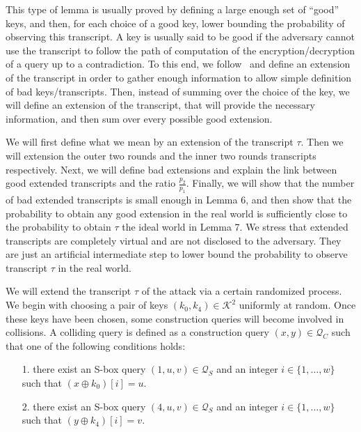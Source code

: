 This type of lemma is usually proved by defining a large enough set of ``good'' keys, and then, for each choice of a good key, lower bounding the probability of observing this transcript. A key is usually said to be good if the adversary cannot use the transcript to follow the path of computation of the encryption/decryption of a query up to a contradiction. To this end, we follow~\cite[Sect. 4.2]{C:CDKLST18} and define an extension of the transcript in order to gather enough information to allow simple definition of bad keys/transcripts. Then, instead of summing over the choice of the key, we will define an extension of the transcript, that will provide the necessary information, and then sum over every possible good extension.


We will first define what we mean by an extension of the transcript $\tau$. Then we will extension the outer two rounds and the inner two rounds transcripts respectively. Next, we will define bad extensions and explain the link between good extended transcripts and the ratio $\frac{p_2}{p_1}$. Finally, we will show that the number of bad extended transcripts is small enough in Lemma 6, and then show that the probability to obtain any good extension in the real world is sufficiently close to the probability to obtain $\tau$ the ideal world in Lemma 7. We stress that extended transcripts are completely virtual and are not disclosed to the adversary. They are just an artificial intermediate step to lower bound the probability to observe transcript $\tau$ in the real world.


We will extend the transcript $\tau$ of the attack via a certain randomized process. We begin with choosing a pair of keys $\left(k_{0}, k_{4}\right) \in \mathcal{K}^{2}$ uniformly at random. Once these keys have been chosen, some construction queries will become involved in collisions. A colliding query is defined as a construction query $(x, y) \in \mathcal{Q}_{C}$ such that one of the following conditions holds:

\begin{itemize}
  \item[1.]
  there exist an S-box query $(1, u, v) \in \mathcal{Q}_{S}$ and an integer $i \in\{1, \ldots, w\}$ such that $\left(x \oplus k_{0}\right)[i]=u$.
  \item[2.]
  there exist an S-box query $(4, u, v) \in \mathcal{Q}_{S}$ and an integer $i \in\{1, \ldots, w\}$ such that $\left(y \oplus k_{4}\right)[i]=v$.
\end{itemize}

